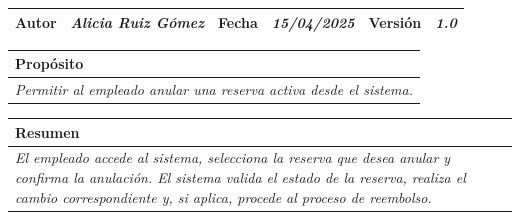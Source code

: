 \begin{table}[H]
\begin{tabular}{llllllll}
    \multicolumn{1}{|l|}{Autor}                                  & \multicolumn{1}{l|}{{\color[HTML]{808080} \textit{Alicia Ruiz Gómez}}}                           & \multicolumn{2}{l|}{Fecha}                                                   & \multicolumn{1}{l|}{{\color[HTML]{808080} \textit{15/04/2025}}}                          & \multicolumn{2}{l|}{Versión}                                                      & \multicolumn{1}{l|}{{\color[HTML]{808080} \textit{1.0}}}                                                     \\ \hline
    \end{tabular}
\end{table}

\begin{table}[H]
    \begin{tabular}{llllllll}
    \hline
    \multicolumn{8}{|l|}{\cellcolor[HTML]{F2F2F2}Propósito}                                                                                                                                                                                                                                                                                                                                                                                           \\ \hline
    \multicolumn{8}{|p{15cm}|}{{\color[HTML]{808080} \textit{Permitir al empleado anular una reserva activa desde el sistema.}}}                                                                                                                                                                                                             \\ \hline
    \end{tabular}
\end{table}

\begin{table}[H]
    \begin{tabular}{llllllll}
    \hline
    \multicolumn{8}{|l|}{\cellcolor[HTML]{F2F2F2}Resumen}                                                                                                                                                                                                                                                                                                                                                                                             \\ \hline
    \multicolumn{8}{|p{15cm}|}{{\color[HTML]{808080} \textit{El empleado accede al sistema, selecciona la reserva que desea anular y confirma la anulación. El sistema valida el estado de la reserva, realiza el cambio correspondiente y, si aplica, procede al proceso de reembolso.}}} \\ \hline
    \end{tabular}
\end{table}



